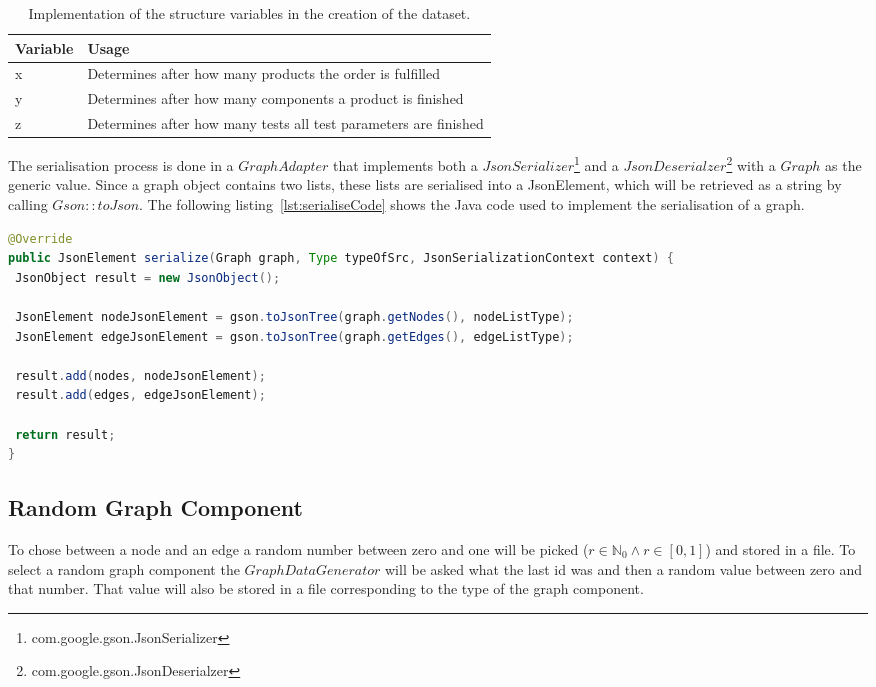 \begin{table}[h!]
  \begin{tabularx}{\textwidth}{ | l | X | }
    \hline
    Variable & Usage \\ \hline \hline
    x & Determines after how many products the order is fulfilled \\ \hline
    y & Determines after how many components a product is finished \\ \hline
    z & Determines after how many tests all test parameters are finished \\ \hline
  \end{tabularx}
  \caption{Implementation of the structure variables in the creation of the dataset.}
  \label{tab:recorderVariables}
\end{table}

The serialisation process is done in a $ GraphAdapter $ that implements both a \linebreak
$ JsonSerializer $\footnote{com.google.gson.JsonSerializer} and a $ JsonDeserialzer $\footnote{com.google.gson.JsonDeserialzer} with a $ Graph $ as the generic value.
Since a graph object contains two lists,
these lists are serialised into a JsonElement,
which will be retrieved as a string by calling $ Gson::toJson $.
The following listing~\ref{lst:serialiseCode} shows the Java code used to implement the serialisation of a graph.

\begin{lstlisting}[language=Java,label={lst:serialiseCode},caption={Serialisation of a graph object.}]
@Override
public JsonElement serialize(Graph graph, Type typeOfSrc, JsonSerializationContext context) {
 JsonObject result = new JsonObject();

 JsonElement nodeJsonElement = gson.toJsonTree(graph.getNodes(), nodeListType);
 JsonElement edgeJsonElement = gson.toJsonTree(graph.getEdges(), edgeListType);

 result.add(nodes, nodeJsonElement);
 result.add(edges, edgeJsonElement);

 return result;
}
\end{lstlisting}

\subsection{Random Graph Component}
To chose between a node and an edge a random number between zero and one will be picked ($ r \in \mathbb{N}_0 \wedge r \in [ 0, 1 ] $) and stored in a file.
To select a random graph component the $ GraphDataGenerator $ will be asked what the last id was and then a random value between zero and that number.
That value will also be stored in a file corresponding to the type of the graph component.

